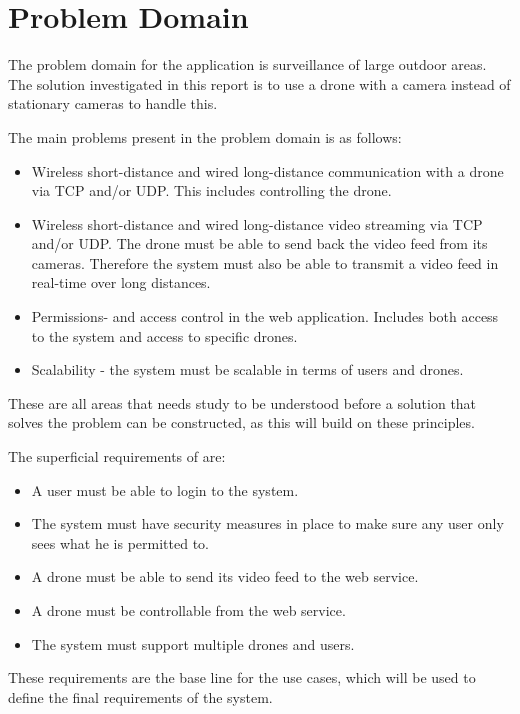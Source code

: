 \section{Problem Domain}
The problem domain for the application is surveillance of large outdoor areas.
The solution investigated in this report is to use a drone with a camera instead of stationary cameras to handle this. \label{problem_domain}

The main problems present in the problem domain is as follows:
\begin{itemize}
	\item Wireless short-distance and wired long-distance communication with a drone via TCP and/or UDP. This includes controlling the drone.
	\item Wireless short-distance and wired long-distance video streaming via TCP and/or UDP. The drone must be able to send back the video feed from its cameras. Therefore the system must also be able to transmit a video feed in real-time over long distances. 
	\item Permissions- and access control in the web application. Includes both access to the system and access to specific drones.
	\item Scalability - the system must be scalable in terms of users and drones.
\end{itemize}

These are all areas that needs study to be understood before a solution that solves the problem can be constructed, as this will build on these principles.

The superficial requirements of \projectname{} are:

\begin{itemize}
	\item A user must be able to login to the system.
	\item The system must have security measures in place to make sure any user only sees what he is permitted to. 
	\item A drone must be able to send its video feed to the web service.
	\item A drone must be controllable from the web service. 
	\item The system must support multiple drones and users. 
\end{itemize}

These requirements are the base line for the use cases, which will be used to define the final requirements of the system. 
